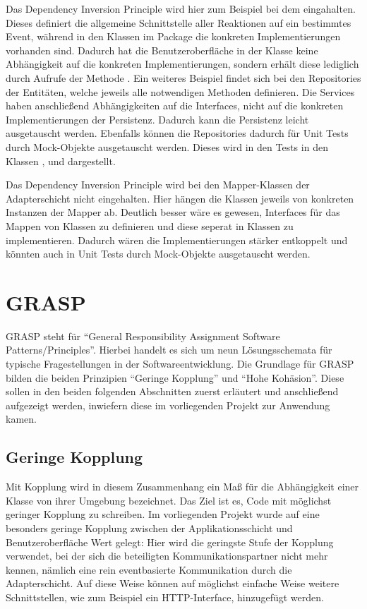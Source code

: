 Das Dependency Inversion Principle wird hier zum Beispiel bei dem  eingahalten. Dieses definiert die allgemeine Schnittstelle aller Reaktionen auf ein bestimmtes Event, während in den Klassen im Package      die konkreten Implementierungen vorhanden sind. Dadurch hat die Benutzeroberfläche in der Klasse  keine Abhängigkeit auf die konkreten Implementierungen, sondern erhält diese lediglich durch Aufrufe der Methode . Ein weiteres Beispiel findet sich bei den Repositories der Entitäten, welche jeweils alle notwendigen Methoden definieren. Die Services haben anschließend Abhängigkeiten auf die Interfaces, nicht auf die konkreten Implementierungen der Persistenz. Dadurch kann die Persistenz leicht ausgetauscht werden. Ebenfalls können die Repositories dadurch für Unit Tests durch Mock-Objekte ausgetauscht werden. Dieses wird in den Tests in den Klassen ,  und  dargestellt.

Das Dependency Inversion Principle wird bei den Mapper-Klassen der Adapterschicht nicht eingehalten. Hier hängen die Klassen jeweils von konkreten Instanzen der Mapper ab. Deutlich besser wäre es gewesen, Interfaces für das Mappen von Klassen zu definieren und diese seperat in Klassen zu implementieren. Dadurch wären die Implementierungen stärker entkoppelt und könnten auch in Unit Tests durch Mock-Objekte ausgetauscht werden.

\section{GRASP}
GRASP steht für \enquote{General Responsibility Assignment Software Patterns/Principles}. Hierbei handelt es sich um neun Lösungsschemata für typische Fragestellungen in der Softwareentwicklung. Die Grundlage für GRASP bilden die beiden Prinzipien \enquote{Geringe Kopplung} und \enquote{Hohe Kohäsion}. Diese sollen in den beiden folgenden Abschnitten zuerst erläutert und anschließend aufgezeigt werden, inwiefern diese im vorliegenden Projekt zur Anwendung kamen.

\subsection{Geringe Kopplung}
Mit Kopplung wird in diesem Zusammenhang ein Maß für die Abhängigkeit einer Klasse von ihrer Umgebung bezeichnet. Das Ziel ist es, Code mit möglichst geringer Kopplung zu schreiben. Im vorliegenden Projekt wurde auf eine besonders geringe Kopplung zwischen der Applikationsschicht und Benutzeroberfläche Wert gelegt: Hier wird die geringste Stufe der Kopplung verwendet, bei der sich die beteiligten Kommunikationspartner nicht mehr kennen, nämlich eine rein eventbasierte Kommunikation durch die Adapterschicht. Auf diese Weise können auf möglichst einfache Weise weitere Schnittstellen, wie zum Beispiel ein HTTP-Interface, hinzugefügt werden.

